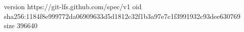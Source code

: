 version https://git-lfs.github.com/spec/v1
oid sha256:1184f8e999772da06909633d5d1812c32f1b3a97e7c1f3991932c93dee630769
size 396640
